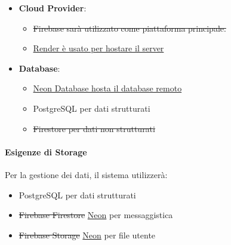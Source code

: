 \begin{itemize}
    \item \textbf{Cloud Provider}:
    \begin{itemize}
        \item \sout{Firebase sarà utilizzato come piattaforma principale.}
        \item \underline{Render è usato per hostare il server}
    \end{itemize}
    \item \textbf{Database}: 
    \begin{itemize}
        \item \underline{Neon Database hosta il database remoto}
        \item PostgreSQL per dati strutturati
        \item \sout{Firestore per dati non strutturati}
    \end{itemize}
\end{itemize}

\paragraph{Esigenze di Storage}

Per la gestione dei dati, il sistema utilizzerà:

\begin{itemize}
    \item PostgreSQL per dati strutturati
    \item \sout{Firebase Firestore} \underline{Neon} per messaggistica
    \item \sout{Firebase Storage} \underline{Neon} per file utente
\end{itemize}